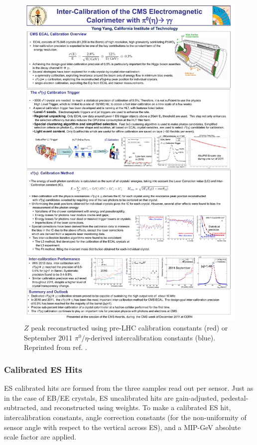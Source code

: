 \documentclass[dissertation.tex]{subfiles}
\begin{document}
\begin{figure}
	\centering
	\includegraphics[scale=1.0]{intercalibration}
	\caption{$Z$ peak reconstructed using pre-LHC calibration constants (red) or September 2011 $\pi^{0}/\eta$-derived intercalibration constants (blue).  Reprinted from ref. \cite{Yang}.}
	\label{fig:intercalibration}
\end{figure}

\subsubsection{Calibrated ES Hits}
\label{sec:Calibrated ES Hits}

\marginpar{\textcolor{blue}{Added parenthetical remark}}ES calibrated hits are formed from the three samples read out per sensor.  Just as in the case of EB/EE crystals, ES uncalibrated hits are gain-adjusted, pedestal-subtracted, and reconstructed using weights.  To make a calibrated ES hit, intercalibration constants, angle correction constants (for the non-uniformity of sensor angle with respect to the vertical across ES), and a MIP-GeV absolute scale factor are applied.
\end{document}
